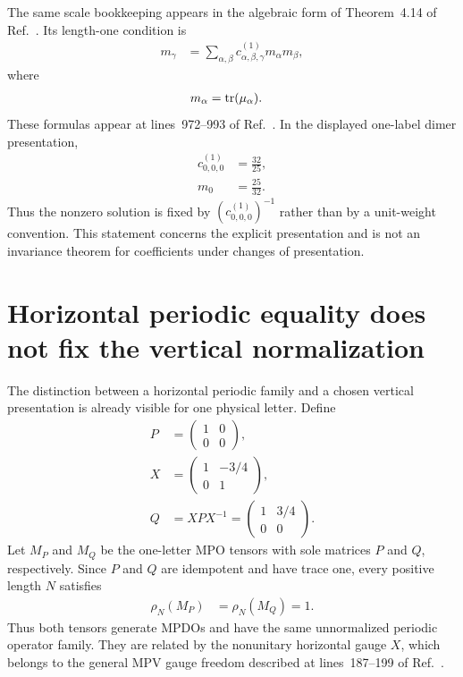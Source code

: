 \documentclass{article}
\begin{document}
The same scale bookkeeping appears in the algebraic form of Theorem~4.14 of
Ref.~\cite{Cirac2016MPDO_arXiv}. Its length-one condition is
\begin{align}
    m_\gamma
    &=\sum_{\alpha,\beta}
      c^{(1)}_{\alpha,\beta,\gamma}m_\alpha m_\beta,
    \label{eq:uw_vertical_length_one_identity}
\end{align}
where
\begin{align}
    m_\alpha
    &=\operatorname{tr}(\mu_\alpha).
    \label{eq:uw_vertical_weight_trace}
\end{align}
These formulas appear at lines~972--993 of
Ref.~\cite{Cirac2016MPDO_arXiv}. In the displayed one-label dimer
presentation,
\begin{align}
    c^{(1)}_{0,0,0}
    &=\frac{32}{25},
    \label{eq:uw_dimer_structure_coefficient}\\
    m_0
    &=\frac{25}{32}.
    \label{eq:uw_dimer_vertical_weight}
\end{align}
Thus the nonzero solution is fixed by $(c^{(1)}_{0,0,0})^{-1}$ rather than by a
unit-weight convention. This statement concerns the explicit presentation and
is not an invariance theorem for coefficients under changes of presentation.

\section{Horizontal periodic equality does not fix the vertical normalization}

The distinction between a horizontal periodic family and a chosen vertical
presentation is already visible for one physical letter. Define
\begin{align}
    P
    &=\begin{pmatrix}1&0\\0&0\end{pmatrix},
    \label{eq:uw_horizontal_projection_p}\\
    X
    &=\begin{pmatrix}1&-3/4\\0&1\end{pmatrix},
    \label{eq:uw_horizontal_gauge_x}\\
    Q
    &=XPX^{-1}
    =\begin{pmatrix}1&3/4\\0&0\end{pmatrix}.
    \label{eq:uw_horizontal_projection_q}
\end{align}
Let $M_P$ and $M_Q$ be the one-letter MPO tensors with sole matrices $P$ and
$Q$, respectively. Since $P$ and $Q$ are idempotent and have trace one, every
positive length $N$ satisfies
\begin{align}
    \rho_N(M_P)
    &=\rho_N(M_Q)
    =1.
    \label{eq:uw_same_horizontal_family}
\end{align}
Thus both tensors generate MPDOs and have the same unnormalized periodic
operator family. They are related by the nonunitary horizontal gauge $X$,
which belongs to the general MPV gauge freedom described at lines~187--199 of
Ref.~\cite{Cirac2016MPDO_arXiv}.
\end{document}
